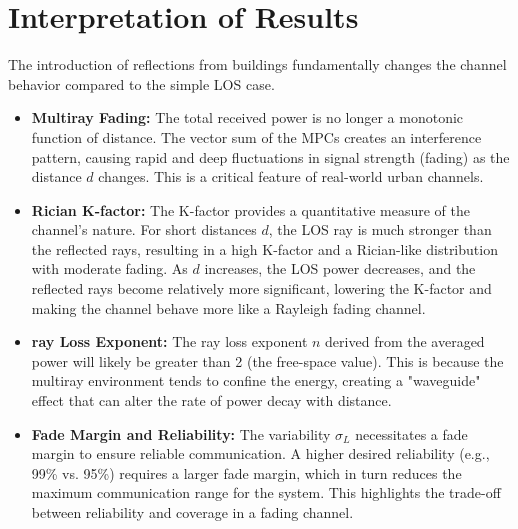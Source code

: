 \section{Interpretation of Results}
The introduction of reflections from buildings fundamentally changes the channel behavior compared to the simple LOS case.
\begin{itemize}
	\item \textbf{Multiray Fading:} The total received power is no longer a monotonic function of distance. The vector sum of the MPCs creates an interference pattern, causing rapid and deep fluctuations in signal strength (fading) as the distance $d$ changes. This is a critical feature of real-world urban channels.
	\item \textbf{Rician K-factor:} The K-factor provides a quantitative measure of the channel's nature. For short distances $d$, the LOS ray is much stronger than the reflected rays, resulting in a high K-factor and a Rician-like distribution with moderate fading. As $d$ increases, the LOS power decreases, and the reflected rays become relatively more significant, lowering the K-factor and making the channel behave more like a Rayleigh fading channel.
	\item \textbf{ray Loss Exponent:} The ray loss exponent $n$ derived from the averaged power will likely be greater than 2 (the free-space value). This is because the multiray environment tends to confine the energy, creating a "waveguide" effect that can alter the rate of power decay with distance.
	\item \textbf{Fade Margin and Reliability:} The variability $\sigma_L$ necessitates a fade margin to ensure reliable communication. A higher desired reliability (e.g., 99\% vs. 95\%) requires a larger fade margin, which in turn reduces the maximum communication range for the system. This highlights the trade-off between reliability and coverage in a fading channel.
\end{itemize}
